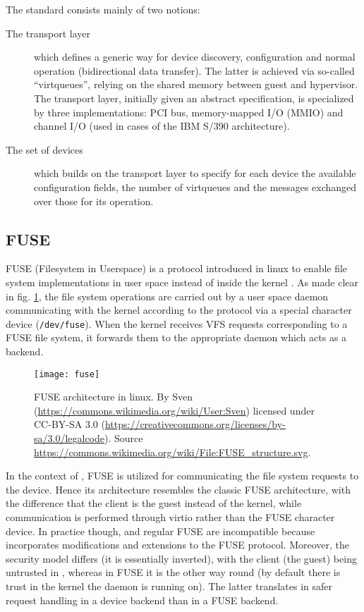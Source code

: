 The standard consists mainly of two notions:
\begin{description}
    \item[The transport layer] which defines a generic way for device discovery,
          configuration and normal operation (bidirectional data transfer). The
          latter is achieved via so-called ``virtqueues'', relying on the shared
          memory between guest and hypervisor. The transport layer, initially
          given an abstract specification, is specialized by three
          implementations: PCI bus, memory-mapped I/O (MMIO) and channel I/O
          (used in cases of the IBM S/390 architecture).
    \item[The set of devices] which builds on the transport layer to specify
          for each device the available configuration fields, the number of
          virtqueues and the messages exchanged over those for its operation.
\end{description}

\subsection{FUSE}

FUSE (Filesystem in Userspace) is a protocol introduced in linux to enable
file system implementations in user space instead of inside the kernel
\cite{fuse}. As made clear in fig. \ref{fig:fuse}, the file system operations
are carried out by a user space daemon communicating with the kernel according
to the protocol via a special character device (\texttt{/dev/fuse}). When the
kernel receives VFS requests corresponding to a FUSE file system, it forwards
them to the appropriate daemon which acts as a backend.

\begin{figure}
    \centering
    \texttt{[image: fuse]}
    \caption[FUSE architecture in linux]{FUSE architecture in linux. By
        Sven (\url{https://commons.wikimedia.org/wiki/User:Sven}) licensed under
        CC-BY-SA 3.0
        (\url{https://creativecommons.org/licenses/by-sa/3.0/legalcode}).
        Source
        \url{https://commons.wikimedia.org/wiki/File:FUSE_structure.svg}.}
    \label{fig:fuse}
\end{figure}

In the context of \viofs{}, FUSE is utilized for communicating the file system
requests to the device. Hence its architecture resembles the classic FUSE
architecture, with the difference that the client is the guest instead of the
kernel, while communication is performed through virtio rather than the FUSE
character device. In practice though, \viofs{} and regular FUSE are incompatible
because \viofs{} incorporates modifications and extensions to the FUSE protocol.
Moreover, the security model differs (it is essentially inverted), with the
client (the guest) being untrusted in \viofs{}, whereas in FUSE it is the other
way round (by default there is trust in the kernel the daemon is running on).
The latter translates in safer request handling in a \viofs{} device backend
than in a FUSE backend.

